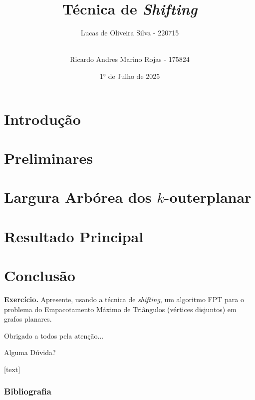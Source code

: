 \documentclass[xcolor=table]{beamer}
\title{Técnica de \emph{Shifting}}
\author{
Lucas de Oliveira Silva - 220715
\and \\
Ricardo Andres Marino Rojas - 175824
}
\institute{MO829 - Algoritmos Parametrizados}
\date{\vfill\hfill 1° de Julho de 2025}
\begin{document}

\begin{frame}[plain]
  \titlepage
\end{frame}


\section{Introdução}


\section{Preliminares}


\section{Largura Arbórea dos $k$-outerplanar}


\section{Resultado Principal}


\section{Conclusão}


\begin{frame}
    \textbf{Exercício.} Apresente, usando a técnica de \emph{shifting}, um algoritmo FPT para o problema do Empacotamento Máximo de Triângulos (vértices disjuntos) em grafos planares.
    \pause

    \vfill
    \centering
    \LARGE{\centerline{Obrigado a todos pela atenção...}}
    \Huge{\centerline{Alguma Dúvida?}}
\end{frame}


\appendix

\beamerdefaultoverlayspecification{}
[text]
\begin{frame}
  \frametitle{Bibliografia}
  {
    \tiny
    
    
  }
\end{frame}

\end{document}
